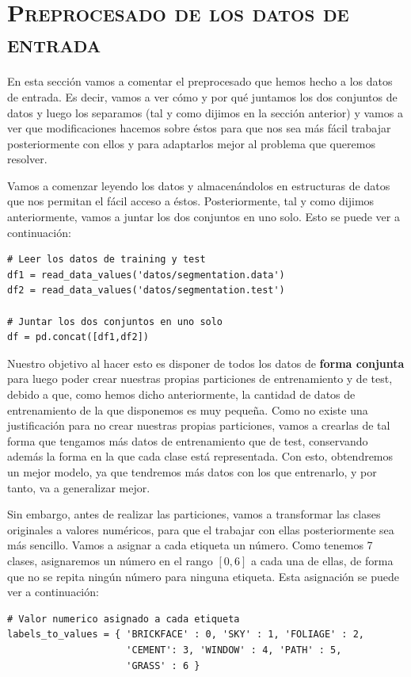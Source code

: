 \documentclass[11pt,a4paper]{article}
\begin{document}
\newpage

\section{\textsc{Preprocesado de los datos de entrada}}

En esta sección vamos a comentar el preprocesado que hemos hecho a los datos de entrada. Es decir, vamos a ver cómo y por qué juntamos
los dos conjuntos de datos y luego los separamos (tal y como dijimos en la sección anterior) y vamos a ver que modificaciones hacemos
sobre éstos para que nos sea más fácil trabajar posteriormente con ellos y para adaptarlos mejor al problema que queremos resolver.

Vamos a comenzar leyendo los datos y almacenándolos en estructuras de datos que nos permitan el fácil acceso a éstos. Posteriormente,
tal y como dijimos anteriormente, vamos a juntar los dos conjuntos en uno solo. Esto se puede ver a continuación:

\begin{lstlisting}
# Leer los datos de training y test
df1 = read_data_values('datos/segmentation.data')
df2 = read_data_values('datos/segmentation.test')

# Juntar los dos conjuntos en uno solo
df = pd.concat([df1,df2])
\end{lstlisting}

Nuestro objetivo al hacer esto es disponer de todos los datos de \textbf{forma conjunta} para luego poder crear nuestras propias particiones de
entrenamiento y de test, debido a que, como hemos dicho anteriormente, la cantidad de datos de entrenamiento de la que disponemos es
muy pequeña. Como no existe una justificación para no crear nuestras propias particiones, vamos a crearlas de tal forma que tengamos más
datos de entrenamiento que de test, conservando además la forma en la que cada clase está representada. Con esto, obtendremos un 
mejor modelo, ya que tendremos más datos con los que entrenarlo, y por tanto, va a generalizar mejor.

Sin embargo, antes de realizar las particiones, vamos a transformar las clases originales a valores numéricos, para que el trabajar
con ellas posteriormente sea más sencillo. Vamos a asignar a cada etiqueta un número. Como tenemos 7 clases, asignaremos un número
en el rango $[0, 6]$ a cada una de ellas, de forma que no se repita ningún número para ninguna etiqueta. Esta asignación se puede ver a
continuación:

\begin{lstlisting}
# Valor numerico asignado a cada etiqueta
labels_to_values = { 'BRICKFACE' : 0, 'SKY' : 1, 'FOLIAGE' : 2,
                     'CEMENT': 3, 'WINDOW' : 4, 'PATH' : 5,
                     'GRASS' : 6 }
\end{lstlisting}
\end{document}

